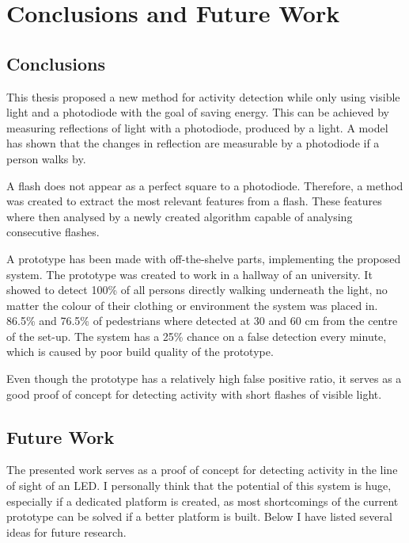 \chapter{Conclusions and Future Work}
\label{chp:conclusionsandfuturework}

\section{Conclusions}
This thesis proposed a new method for activity detection while only using visible light and a photodiode with the goal of saving energy. This can be achieved by measuring reflections of light with a photodiode, produced by a light. A model has shown that the changes in reflection are measurable by a photodiode if a person walks by.

A flash does not appear as a perfect square to a photodiode. Therefore, a method was created to extract the most relevant features from a flash. These features where then analysed by a newly created algorithm capable of analysing consecutive flashes.

A prototype has been made with off-the-shelve parts, implementing the proposed system. The prototype was created to work in a hallway of an university. It showed to detect 100\% of all persons directly walking underneath the light, no matter the colour of their clothing or environment the system was placed in. 86.5\% and 76.5\% of pedestrians where detected at 30 and 60 cm from the centre of the set-up. The system has a 25\% chance on a false detection every minute, which is caused by poor build quality of the prototype.

Even though the prototype has a relatively high false positive ratio, it serves as a good proof of concept for detecting activity with short flashes of visible light.

\section{Future Work}
The presented work serves as a proof of concept for detecting activity in the line of sight of an LED. I personally think that the potential of this system is huge, especially if a dedicated platform is created, as most shortcomings of the current prototype can be solved if a better platform is built. Below I have listed several ideas for future research.


